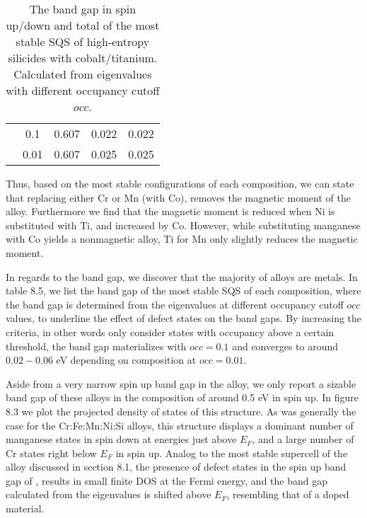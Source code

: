 \begin{table}[H]
\begin{tabular}{@{}ccccc@{}}
\multicolumn{1}{c|}{}                             & \multicolumn{1}{c|}{0.1}  & 0.607                                                                         & 0.022                                                                        & 0.022                                                                         \\
\multicolumn{1}{c|}{}                             & \multicolumn{1}{c|}{0.01}                      & 0.607                                                                         & 0.025                                                                        & 0.025                                                                         \\ \bottomrule
\end{tabular}
\caption{The band gap in spin up/down and total of the most stable SQS of high-entropy silicides with cobalt/titanium. Calculated from eigenvalues with different occupancy cutoff $occ$. }
\end{table}

Thus, based on the most stable configurations of each composition, we can state that replacing either Cr or Mn (with Co), removes the magnetic moment of the alloy. Furthermore we find that the magnetic moment is reduced when Ni is substituted with Ti, and increased by Co. However, while substituting manganese with Co yields a nonmagnetic alloy, Ti for Mn only slightly reduces the magnetic moment. 

In regards to the band gap, we discover that the majority of alloys are metals. In table 8.5, we list the band gap of the most stable SQS of each composition, where the band gap is determined from the eigenvalues at different occupancy cutoff $occ$ values, to underline the effect of defect states on the band gaps. By increasing the criteria, in other words only consider states with occupancy above a certain threshold, the band gap materializes with $occ = 0.1$ and converges to around $0.02 - 0.06$ eV depending on composition at $occ = 0.01$.
 
Aside from a very narrow spin up band gap in the  alloy, we only report a sizable band gap of these alloys in the  composition of around 0.5 eV in spin up. In figure 8.3 we plot the projected density of states of this structure. As was generally the case for the Cr:Fe:Mn:Ni:Si alloys, this structure displays a dominant number of manganese states in spin down at energies just above $E_F$, and a large number of Cr states right below $E_F$ in spin up. Analog to the most stable supercell of the  alloy discussed in section 8.1, the presence of defect states in the spin up band gap of , results in small finite DOS at the Fermi energy, and the band gap calculated from the eigenvalues is shifted above $E_F$, resembling that of a doped material.  
  

